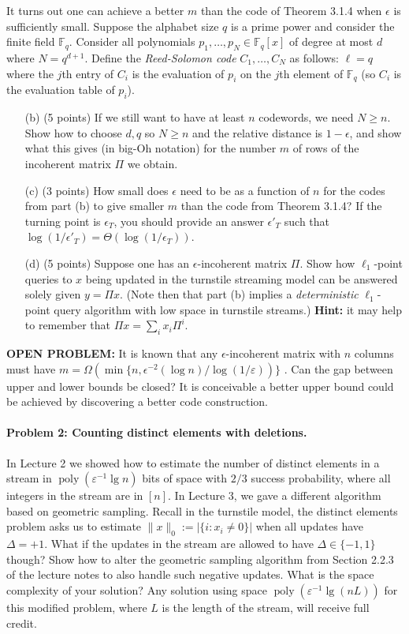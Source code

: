 \documentclass[12pt]{article}
\newcommand{\eps}{\varepsilon}
\begin{document}
  It turns out one can achieve a better $m$ than the code of Theorem 3.1.4 when $\epsilon$ is sufficiently small. Suppose the alphabet size $q$ is a prime power and consider the finite field $\mathbb{F}_q$. Consider all polynomials $p_1,\ldots,p_N\in \mathbb{F}_q[x]$ of degree at most $d$ where $N = q^{d+1}$. Define the {\em Reed-Solomon code} $C_1,\ldots,C_N$ as follows: $\ell = q$ where the $j$th entry of $C_i$ is the evaluation of $p_i$ on the $j$th element of $\mathbb{F}_q$ (so $C_i$ is the evaluation table of $p_i$).

\begin{itemize} 
\item[(b)] (5 points) If we still want to have at least $n$ codewords, we need $N \ge n$. Show how to choose $d,q$ so $N \ge n$ and the relative distance is $1-\epsilon$, and show what this gives (in big-Oh notation) for the number $m$ of rows of the incoherent matrix $\Pi$ we obtain.
\item[(c)] (3 points) How small does $\epsilon$ need to be as a function of $n$ for the codes from part (b) to give smaller $m$ than the code from Theorem 3.1.4? If the turning point is $\epsilon_T$, you should provide an answer $\epsilon'_T$ such that $\log(1/\epsilon'_T) = \Theta(\log(1/\epsilon_T))$.
\item[(d)] (5 points) Suppose one has an $\epsilon$-incoherent matrix $\Pi$. Show how $\ell_1$-point queries to $x$ being updated in the turnstile streaming model can be answered solely given $y = \Pi x$. (Note then that part (b) implies a {\em deterministic} $\ell_1$-point query algorithm with low space in turnstile streams.) \textbf{Hint:} it may  help to remember that $\Pi x = \sum_i x_i \Pi^i$.
\end{itemize}


\noindent \textbf{OPEN PROBLEM:} It is known that any $\epsilon$-incoherent matrix with $n$ columns must have $m = \Omega(\min\{n, \epsilon^{-2}(\log n)/\log(1/\eps))\}$ \cite[Section 9]{Alon03}. Can the gap between upper and lower bounds be closed? It is conceivable a better upper bound could be achieved by discovering a better code construction.

\paragraph{Problem 2: Counting distinct elements with deletions.}  In Lecture 2 we showed how to estimate the number of distinct elements in a stream in $\mathop{poly}(\eps^{-1}\lg n)$ bits of space with $2/3$ success probability, where all integers in the stream are in $[n]$. In Lecture 3, we gave a different algorithm based on geometric sampling. Recall in the turnstile model, the distinct elements problem asks us to estimate $\|x\|_0 := |\{i : x_i\neq 0\}|$ when all updates have $\Delta=+1$. What if the updates in the stream are allowed to have $\Delta\in\{-1,1\}$ though? Show how to alter the geometric sampling algorithm from Section 2.2.3 of the lecture notes to also handle such negative updates. What is the space complexity of your solution? Any solution using space $\mathop{poly}(\eps^{-1}\lg (nL))$ for this modified problem, where $L$ is the length of the stream, will receive full credit.
\end{document}
